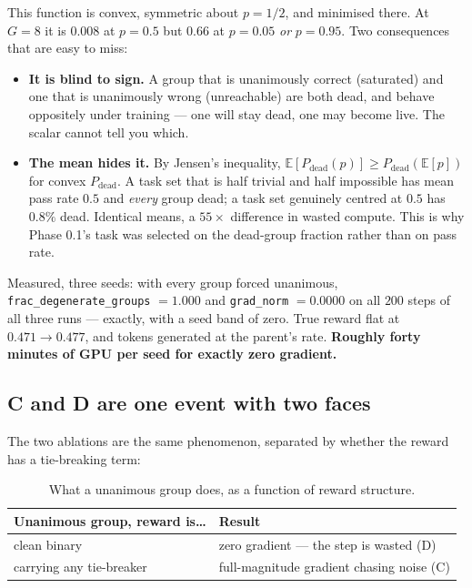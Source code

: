 \documentclass[11pt,letterpaper]{article}
\theoremstyle{definition}
\newcommand{\E}{\mathbb{E}}
\begin{document}
This function is convex, symmetric about $p = 1/2$, and minimised there. At $G = 8$ it is $0.008$ at
$p = 0.5$ but $0.66$ at $p = 0.05$ \emph{or} $p = 0.95$. Two consequences that are easy to miss:

\begin{itemize}
  \item \textbf{It is blind to sign.} A group that is unanimously correct (saturated) and one that is
        unanimously wrong (unreachable) are both dead, and behave oppositely under training --- one
        will stay dead, one may become live. The scalar cannot tell you which.
  \item \textbf{The mean hides it.} By Jensen's inequality, $\E[P_{\text{dead}}(p)] \ge
        P_{\text{dead}}(\E[p])$ for convex $P_{\text{dead}}$. A task set that is half trivial and half
        impossible has mean pass rate $0.5$ and \emph{every} group dead; a task set genuinely centred
        at $0.5$ has $0.8\%$ dead. Identical means, a $55\times$ difference in wasted compute. This is
        why Phase 0.1's task was selected on the dead-group fraction rather than on pass rate.
\end{itemize}

Measured, three seeds: with every group forced unanimous, \texttt{frac\_degenerate\_groups} $= 1.000$
and \texttt{grad\_norm} $= 0.0000$ on all $200$ steps of all three runs --- exactly, with a seed band
of zero. True reward flat at $0.471 \to 0.477$, and tokens generated at the parent's rate.
\textbf{Roughly forty minutes of GPU per seed for exactly zero gradient.}

\subsection{C and D are one event with two faces}

The two ablations are the same phenomenon, separated by whether the reward has a tie-breaking term:

\begin{table}[H]
\centering
\caption{What a unanimous group does, as a function of reward structure.}
\label{tab:cd}
\small
\begin{tabular}{@{}ll@{}}
\toprule
\textbf{Unanimous group, reward is\ldots} & \textbf{Result} \\
\midrule
clean binary              & zero gradient --- the step is wasted (D) \\
carrying any tie-breaker  & full-magnitude gradient chasing noise (C) \\
\bottomrule
\end{tabular}
\end{table}
\end{document}
